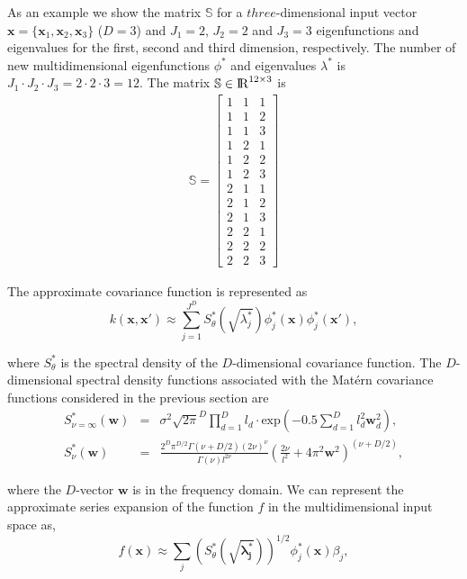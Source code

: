 \documentclass[]{interact}
\theoremstyle{plain}%
\theoremstyle{definition}
\theoremstyle{remark}
\begin{document}
As an example we show the matrix $\mathbb{S}$ for a $three$-dimensional input vector $\mathbf{x}=\{\mathbf{x}_1,\mathbf{x}_2,\mathbf{x}_3\}$ ($D=3$) and $J_{1}=2$, $J_{2}=2$ and $J_{3}=3$ eigenfunctions and eigenvalues for the first, second and third dimension, respectively. The number of new multidimensional eigenfunctions $\phi^{\ast}$ and eigenvalues $\lambda^{\ast}$ is $J_{1}\cdot J_{2}\cdot J_{3}=2\cdot 2\cdot 3=12$. The matrix $\mathbb{S}\in {\rm I\!R}^{12 \times 3}$ is
%
\begin{eqnarray}
\mathbb{S}=
\left[ {\begin{array}{ccc}
1 & 1 & 1 \nonumber \\
1 & 1 & 2 \\
1 & 1 & 3 \\
1 & 2 & 1 \\
1 & 2 & 2 \\
1 & 2 & 3 \\
2 & 1 & 1 \\
2 & 1 & 2 \\
2 & 1 & 3 \\
2 & 2 & 1 \\
2 & 2 & 2 \\
2 & 2 & 3 
\end{array} } \right]
\end{eqnarray} 


The approximate covariance function is represented as
%
\begin{equation}\label{approxcov_multi}
k(\mathbf{x},\mathbf{x}') \approx \sum_{j=1}^{J^D} S^{\ast}_{\theta}\left(\sqrt{\lambda^{\ast}_j}\right) \phi^{\ast}_j(\mathbf{x}) \phi^{\ast}_j(\mathbf{x}'),
\end{equation}

\noindent where $S^{\ast}_{\theta}$ is the spectral density of the $D$-dimensional covariance function. The $D$-dimensional spectral density functions associated with the Mat\'ern covariance functions considered in the previous section are
%
\begin{eqnarray}
S^{\ast}_{\nu=\infty}(\mathbf{w})&=& \sigma^2 \sqrt{2\pi}^D \prod_{d=1}^D l_d \cdot \text{exp}\left(-0.5 \sum_{d=1}^D l_d^2 \mathbf{w}_d^2\right), \nonumber \\
%
S^{\ast}_{\nu}(\mathbf{w})&=& \frac{2^D\pi^{D/2}\Gamma(\nu+D/2)(2\nu)^{\nu}}{\Gamma(\nu)l^{2\nu}}\left(\frac{2\nu}{l^2}+4\pi^2\mathbf{w}^2 \right)^{(\nu+D/2)}, \nonumber
\end{eqnarray}

\noindent where the $D$-vector $\mathbf{w}$ is in the frequency domain. We can represent the approximate series expansion of the function $f$ in the multidimensional input space as,
%
\begin{equation}\label{approxf}
f(\mathbf{x}) \approx \sum_{j} \left( S^{\ast}_{\theta}(\sqrt{\boldsymbol{\lambda^{\ast}_j}})\right)^{1/2} \phi^{\ast}_j(\mathbf{x}) \beta_j, 
\end{equation}
\end{document}
